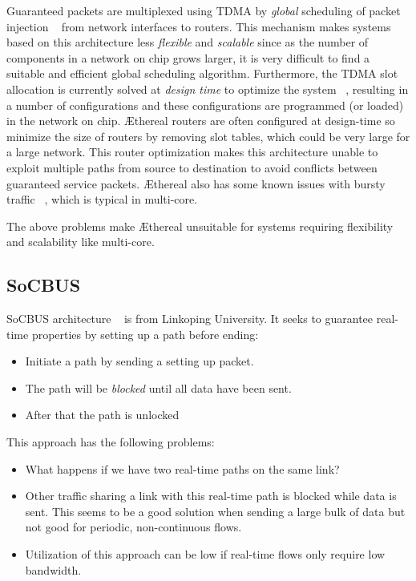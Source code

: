\documentclass[conference, twocolumn]{IEEEtran}
\theoremstyle{definition}
\begin{document}
Guaranteed packets are multiplexed using TDMA by {\em global} scheduling of
packet injection ~\cite{Moonen07SPRINGER} from network interfaces to
routers. This mechanism makes systems based on this architecture less
{\em flexible} and {\em scalable} since as the number of components in a network
on chip grows larger, it is very difficult to find a suitable and efficient {global  scheduling} algorithm.
Furthermore, the TDMA slot allocation is currently solved at {\em design time}
to optimize the system ~\cite{Moonen07SPRINGER}, resulting in a number of
configurations and these configurations are programmed (or loaded) in the
network on chip. \AE thereal routers are often configured at design-time so
minimize the size of routers by removing slot tables, which could be very large
for a large network. This router optimization makes this architecture unable to
exploit multiple paths from source to destination to avoid conflicts between
guaranteed service packets. \AE thereal also has some known issues with bursty
traffic ~\cite{Hansson07ISSS}, which is typical in multi-core.

The above problems make \AE thereal unsuitable for systems requiring
flexibility and scalability like multi-core.

\subsection{SoCBUS}
SoCBUS architecture ~\cite{SoCBUS} is from Linkoping University. It seeks to 
guarantee real-time properties by setting up a path before ending:
\begin{itemize}
\item Initiate a path by sending a setting up packet.
\item The path will be {\em blocked} until all data have been sent.
\item After that the path is unlocked
\end{itemize}
This approach has the following problems: 
\begin{itemize}
\item What happens if we have two real-time paths on the same link?
\item Other traffic sharing a link with this real-time path is blocked while 
data is sent. This seems to be a good solution when sending a large bulk of data 
but not good for periodic, non-continuous flows.
\item Utilization of this approach can be low if real-time flows only require
low bandwidth.
\end{itemize}
\end{document}
